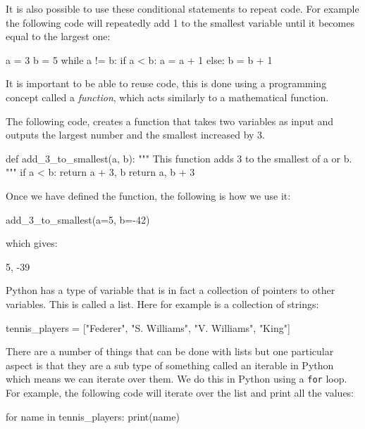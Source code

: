 It is also possible to use these conditional statements to repeat code. For
example the following code will repeatedly add 1 to the smallest variable until
it becomes equal to the largest one:

\begin{pyin}
a = 3
b = 5
while a != b:
    if a < b:
        a = a + 1
    else:
        b = b + 1
\end{pyin}

It is important to be able to reuse code, this is done using a programming
concept called a \textit{function}, which acts similarly to a mathematical
function.

The following code, creates a function that takes two variables as input and
outputs the largest number and the smallest increased by 3.

\begin{pyin}
def add_3_to_smallest(a, b):
    """ 
    This function adds 3 to the smallest of a or b.
    """
    if a < b:
        return a + 3, b
    return a, b + 3
\end{pyin}

Once we have defined the function, the following is how we use it:

\begin{pyin}
add_3_to_smallest(a=5, b=-42)
\end{pyin}

which gives:

\begin{pyout}
5, -39
\end{pyout}

Python has a type of variable that is in fact a collection of pointers to other
variables. This is called a list. Here for example is a collection of strings:

\begin{pyin}
tennis_players = ["Federer", "S. Williams", "V. Williams", "King"]
\end{pyin}

There are a number of things that can be done with lists but one particular
aspect is that they are a sub type of something called an iterable in Python
which means we can iterate over them. We do this in Python using a
\texttt{for} loop. For example, the following code will iterate over
the list and print all the values:

\begin{pyin}
for name in tennis_players:
    print(name)
\end{pyin}

